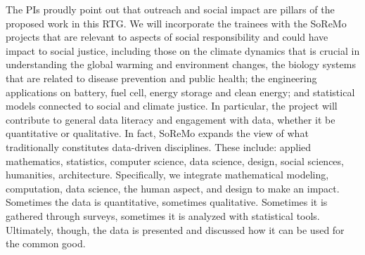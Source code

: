 \documentclass[11pt]{NSFamsart}
\begin{document}
The PIs proudly point out that outreach and social impact are pillars of the proposed work in this RTG.
 We will incorporate the trainees with the SoReMo projects that are relevant to aspects of social responsibility and could have impact to social justice, including those on the climate dynamics that is crucial in understanding the global warming and environment changes, the biology systems that are related to disease prevention and public health; the engineering applications on battery, fuel cell, energy storage and clean energy; and statistical models connected to social and climate justice. 
In particular, the project will contribute to general  data literacy and engagement with data, whether it be quantitative or qualitative. In fact, SoReMo expands the view of what traditionally constitutes data-driven disciplines. These include: applied mathematics, statistics, computer science, data science, design, social sciences, humanities, architecture. Specifically, we integrate mathematical modeling, computation, data science, the human aspect, and design to make an impact. Sometimes the data is quantitative, sometimes qualitative. Sometimes it is gathered through surveys, sometimes it is analyzed with statistical tools. Ultimately, though, the data is presented and discussed how it can be used for the common good. 
\end{document}
